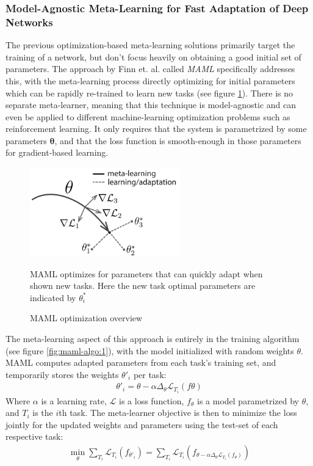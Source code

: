 \documentclass{report}
\begin{document}
\subsubsection{Model-Agnostic Meta-Learning for Fast Adaptation of Deep Networks}
The previous optimization-based meta-learning solutions primarily target the training of a network, but don't focus heavily on obtaining a good initial set of parameters. The approach by Finn et. al. \parencite{maml} called \emph{MAML} specifically addresses this, with the meta-learning process directly optimizing for initial parameters which can be rapidly re-trained to learn new tasks (see figure \ref{fig:maml-params:1}). There is no separate meta-learner, meaning that this technique is model-agnostic and can even be applied to different machine-learning optimization problems such as reinforcement learning. It only requires that the system is parametrized by some parameters $\bm{\theta}$, and that the loss function is smooth-enough in those parameters for gradient-based learning.
\begin{figure}[h]
 \centering
 \includegraphics[width=6.5cm]{mamlparams}
 \caption{MAML optimization overview}
 MAML optimizes for parameters that can quickly adapt when shown new tasks. Here the new task optimal parameters are indicated by $\theta^*_i$
 \label{fig:maml-params:1}
\end{figure}
The meta-learning aspect of this approach is entirely in the training algorithm (see figure \ref{fig:maml-algo:1}), with the model initialized with random weights $\theta$. MAML computes adapted parameters from each task's training set, and temporarily stores the weights $\theta'_i$ per task:
\begin{align}
 \theta'_i = \theta - \alpha \Delta_{\theta} \mathcal{L}_{T_{i}}(f\theta)
\end{align}
Where $\alpha$ is a learning rate, $\mathcal{L}$ is a loss function, $f_\theta$ is a model parametrized by $\theta$, and $T_i$ is the $i$th task.
The meta-learner objective is then to minimize the loss jointly for the updated weights and parameters using the test-set of each respective task:
\begin{align}
 \min_\theta
 \sum_{T_i} \mathcal{L}_{T_{i}}(f_{\theta'_i}) =
 \sum_{T_i}\mathcal{L}_{T_{i}}(f_{\theta-\alpha\Delta_\theta\mathcal{L}_{T_{i}}(f_\theta)}) \label{eqn:maml}
\end{align}
\end{document}
